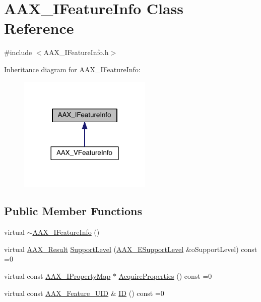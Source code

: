 \hypertarget{a00100}{}\section{A\+A\+X\+\_\+\+I\+Feature\+Info Class Reference}
\label{a00100}


{\ttfamily \#include $<$A\+A\+X\+\_\+\+I\+Feature\+Info.\+h$>$}



Inheritance diagram for A\+A\+X\+\_\+\+I\+Feature\+Info\+:
\nopagebreak
\begin{figure}[H]
\begin{center}
\leavevmode
\includegraphics[width=180pt]{a00633}
\end{center}
\end{figure}
\subsection*{Public Member Functions}
\begin{DoxyCompactItemize}
\item 
virtual \hyperlink{a00100_a41bb5b2ba57b7883c9f96539fcd46fb3}{$\sim$\+A\+A\+X\+\_\+\+I\+Feature\+Info} ()
\item 
virtual \hyperlink{a00149_a4d8f69a697df7f70c3a8e9b8ee130d2f}{A\+A\+X\+\_\+\+Result} \hyperlink{a00100_a5f105b85ef855eb8c3da0ff06325b018}{Support\+Level} (\hyperlink{a00206_aca7bf42860665d5da66f4ac342e761b3}{A\+A\+X\+\_\+\+E\+Support\+Level} \&o\+Support\+Level) const =0
\item 
virtual const \hyperlink{a00112}{A\+A\+X\+\_\+\+I\+Property\+Map} $\ast$ \hyperlink{a00100_ab74a4576cd4e87baa01d046dfa0c752e}{Acquire\+Properties} () const =0
\item 
virtual const \hyperlink{a00149_a53d6cf8a08224b3e813333e411ce798e}{A\+A\+X\+\_\+\+Feature\+\_\+\+U\+I\+D} \& \hyperlink{a00100_aec2b87eadca9e5d55d7b93163b5ee1da}{I\+D} () const =0
\end{DoxyCompactItemize}


